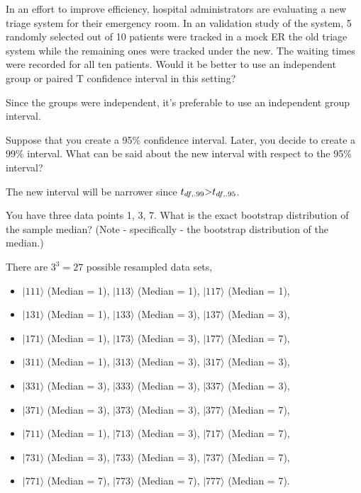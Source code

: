 \documentclass{homework}
\begin{document}
\begin{tcolorbox}[title=Question 4]
In an effort to improve efficiency, hospital administrators are evaluating a new triage system for their emergency room. In an validation study of the system, 5 randomly selected out of 10 patients were tracked in a mock ER the old triage system while the remaining ones were tracked under the new. The waiting times were recorded for all ten patients. Would it be better to use an independent group or paired T confidence interval in this setting?
\end{tcolorbox}

Since the groups were independent, it's preferable to use an independent group interval. \\

\begin{tcolorbox}[title=Question 5]
Suppose that you create a 95\% confidence interval. Later, you decide to create a 99\% interval. What can be said about the new interval with respect to the 95\% interval?
\end{tcolorbox}

The new interval will be narrower since $t_{df,.99}\mbox{\textgreater}t_{df,.95}$.

\begin{tcolorbox}[title=Question 6]
You have three data points {1, 3, 7}. What is the exact bootstrap distribution of the sample median? (Note - specifically - the bootstrap distribution of the median.)
\end{tcolorbox}

There are $3^3=27$ possible resampled data sets, 

\begin{itemize}
  \item $|111\rangle$ (Median = 1), $|113\rangle$ (Median = 1), $|117\rangle$ (Median = 1), 
  \item $|131\rangle$ (Median = 1), $|133\rangle$ (Median = 3), $|137\rangle$ (Median = 3),
  \item $|171\rangle$ (Median = 1), $|173\rangle$ (Median = 3), $|177\rangle$ (Median = 7), 
  \item $|311\rangle$ (Median = 1), $|313\rangle$ (Median = 3), $|317\rangle$ (Median = 3), 
  \item $|331\rangle$ (Median = 3), $|333\rangle$ (Median = 3), $|337\rangle$ (Median = 3),
  \item $|371\rangle$ (Median = 3), $|373\rangle$ (Median = 3), $|377\rangle$ (Median = 7),
  \item $|711\rangle$ (Median = 1), $|713\rangle$ (Median = 3), $|717\rangle$ (Median = 7),
  \item $|731\rangle$ (Median = 3), $|733\rangle$ (Median = 3), $|737\rangle$ (Median = 7),
  \item $|771\rangle$ (Median = 7), $|773\rangle$ (Median = 7), $|777\rangle$ (Median = 7). 
\end{itemize}
\end{document}
